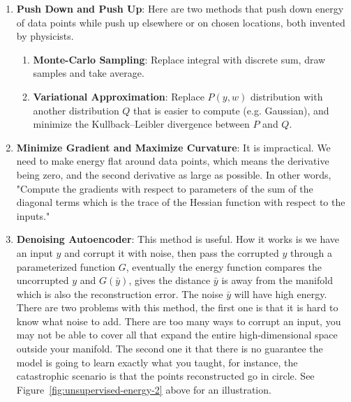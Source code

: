 \begin{enumerate}
    \item \textbf{Push Down and Push Up}: Here are two methods that push down energy of data points while push up elsewhere or on chosen locations, both invented by physicists.
    \begin{enumerate}
        \item \textbf{Monte-Carlo Sampling}: Replace integral with discrete sum, draw samples and take average.
        \item \textbf{Variational Approximation}: Replace $P(y, w)$ distribution with another distribution $Q$ that is easier to compute (e.g. Gaussian), and minimize the Kullback–Leibler divergence between $P$ and $Q$.
    \end{enumerate}

    \item \textbf{Minimize Gradient and Maximize Curvature}: It is impractical. We need to make energy flat around data points, which means the derivative being zero, and the second derivative as large as possible. In other words, "Compute the gradients with respect to parameters of the sum of the diagonal terms which is the trace of the Hessian function with respect to the inputs."

    \item \textbf{Denoising Autoencoder}: This method is useful. How it works is we have an input $y$ and corrupt it with noise, then pass the corrupted $y$ through a parameterized function $G$, eventually the energy function compares the uncorrupted $y$ and $G(\bar{y})$, gives the distance $\bar{y}$ is away from the manifold which is also the reconstruction error. The noise $\bar{y}$ will have high energy. There are two problems with this method, the first one is that it is hard to know what noise to add. There are too many ways to corrupt an input, you may not be able to cover all that expand the entire high-dimensional space outside your manifold. The second one it that there is no guarantee the model is going to learn exactly what you taught, for instance, the catastrophic scenario is that the points reconstructed go in circle. See Figure~\ref{fig:unsupervised-energy-2} above for an illustration.
\end{enumerate}